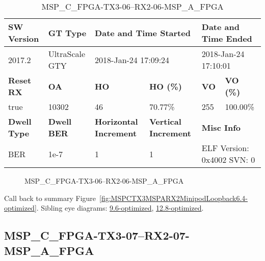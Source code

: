 \begin{table}[h]
\centering
\caption{MSP\_C\_FPGA-TX3-06--RX2-06-MSP\_A\_FPGA}
\label{tab:MSPCFPGATX306RX206MSPAFPGA6.4-optimized}
\begin{tabular}{@{}|l|l|l|l|l|l|@{}}
\toprule
\textbf{SW Version}                & \textbf{GT Type}   & \multicolumn{2}{l|}{\textbf{Date and Time Started}}            & \multicolumn{2}{l|}{\textbf{Date and Time Ended}}        \\ \midrule
2017.2                       & UltraScale GTY          & \multicolumn{2}{l|}{2018-Jan-24 17:09:24}                   & \multicolumn{2}{l|}{2018-Jan-24 17:10:01}               \\ \midrule
\textbf{Reset RX}                  & \textbf{OA} & \textbf{HO}   & \textbf{HO (\%)} & \textbf{VO} & \textbf{VO (\%)} \\ \midrule
true & 10302        & 46          & 70.77\%        & 255        & 100.00\%       \\ \midrule
\textbf{Dwell Type}                & \textbf{Dwell BER} & \textbf{Horizontal Increment} & \textbf{Vertical Increment}    & \multicolumn{2}{l|}{\textbf{Misc Info}}                  \\ \midrule
BER                            & 1e-7        & 1        & 1           & \multicolumn{2}{l|}{ELF Version: 0x4002 SVN: 0}                         \\ \bottomrule
\end{tabular}
\end{table}

\begin{figure}[h]
\caption{MSP\_C\_FPGA-TX3-06--RX2-06-MSP\_A\_FPGA} \label{fig:MSPCFPGATX306RX206MSPAFPGA6.4-optimized}
\end{figure}

Call back to summary Figure~\ref{fig:MSPCTX3MSPARX2MinipodLoopback6.4-optimized}.
Sibling eye diagrams: \hyperref[sec:MSPCFPGATX306RX206MSPAFPGA9.6-optimized]{9.6-optimized}, \hyperref[sec:MSPCFPGATX306RX206MSPAFPGA12.8-optimized]{12.8-optimized}.

\clearpage
\newpage


\subsection{MSP\_C\_FPGA-TX3-07--RX2-07-MSP\_A\_FPGA}\label{sec:MSPCFPGATX307RX207MSPAFPGA6.4-optimized}

